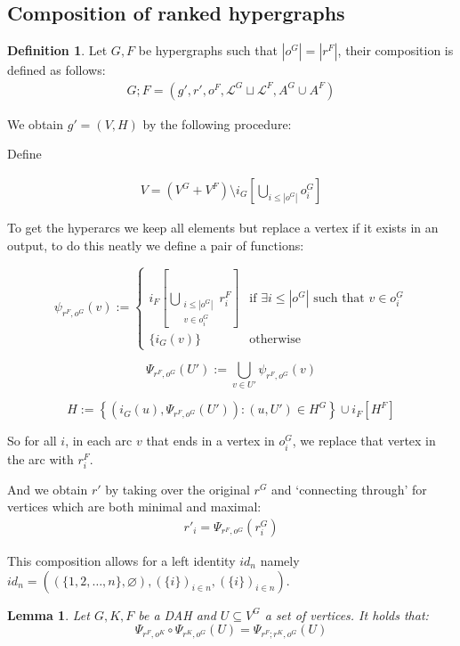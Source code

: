 \documentclass[12pt]{article}
\newtheorem{lemma}[theorem]{Lemma}
\theoremstyle{definition}
\newtheorem{definition}[theorem]{Definition}
\newcommand{\1}{\mathbbm{1}}
\renewcommand{\L}{\mathcal{L}}
\newcommand{\seq}{;}
\begin{document}
\subsection{Composition of ranked hypergraphs}
\begin{definition}\label{def_seq_comp}
Let $G, F$ be hypergraphs such that $|o^G| = |r^F|$, their composition is defined as follows:
\begin{align}
    G\seq F = (g', r', o^F, \L^G\sqcup \L^F, A^G\cup A^F)
\end{align}

We obtain $g' = (V,H)$ by the following procedure:

Define 

\begin{align*}
    V = (V^G + V^F) \setminus i_G[\bigcup_{i\leq |o^G|}o^G_i]
\end{align*}

To get the hyperarcs we keep all elements but replace a vertex if it exists in an output, to do this neatly we define a pair of functions:

\[
\psi_{r^F, o^G}(v) := 
\begin{cases}
    i_F[\displaystyle\bigcup_{\substack{i\leq |o^G| \\ v \in o^G_i}} r^F_i] & \text{if } \exists i \leq |o^G| \text{ such that } v \in o^G_i \\
    \{i_G(v)\} & \text{otherwise}
\end{cases}
\]

\[
\Psi_{r^F, o^G}(U') := \bigcup_{v \in U'} \psi_{r^F, o^G}(v)
\]

\[
H := \left\{ \left(i_G(u), \Psi_{r^F, o^G}(U')\right) : (u, U') \in H^G \right\} \cup i_F[H^F]
\]

So for all $i$, in each arc $v$ that ends in a vertex in $o_i^G$, we replace that vertex in the arc with $r_i^F$. 

And we obtain $r'$ by taking over the original $r^G$ and `connecting through' for vertices which are both minimal and maximal:
\begin{align*}
    r'_i = \Psi_{r^F, o^G}(r^G_i)
\end{align*}
\end{definition} %

This composition allows for a left identity $id_n$ namely $id_n = ((\{1,2,\dots,n\}, \varnothing), (\{i\})_{i\in n}, (\{i\})_{i\in n})$.

\begin{lemma}\label{lem:psieq}
    Let $G,K,F$ be a DAH and $U\subseteq V^G$ a set of vertices. It holds that:
    \[
        \Psi_{r^F, o^K}\circ \Psi_{r^K, o^G}(U) = \Psi_{r^F\seq r^K, o^G}(U)
    \]
\end{lemma}
\end{document}
